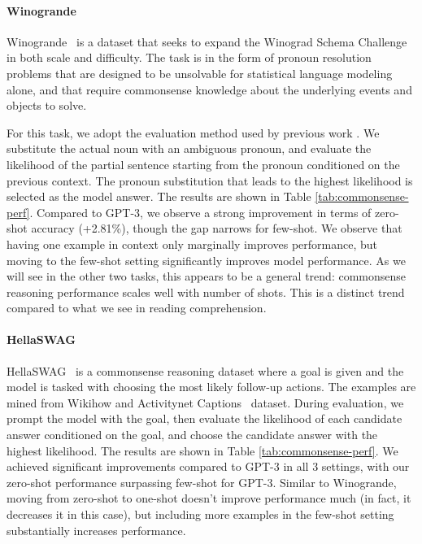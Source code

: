 \documentclass[11pt]{article}
\begin{document}
\paragraph{Winogrande} Winogrande~\citep{Sakaguchi2020WINOGRANDEAA} is a dataset that seeks to expand the Winograd Schema Challenge in both scale and difficulty. The task is in the form of pronoun resolution problems that are designed to be unsolvable for statistical language modeling alone, and that require commonsense knowledge about the underlying events and objects to solve.

For this task, we adopt the evaluation method used by previous work \cite{brown2020language,gpt2-radford2019language,trinh18}. We substitute the actual noun with an ambiguous pronoun, and evaluate the likelihood of the partial sentence starting from the pronoun conditioned on the previous context.  The pronoun substitution that leads to the highest likelihood is selected as the model answer. The results are shown in Table \ref{tab:commonsense-perf}. Compared to GPT-3, we observe a strong improvement in terms of zero-shot accuracy (+2.81\%), though the gap narrows for few-shot. We observe that having one example in context only marginally improves performance, but moving to the few-shot setting significantly improves model performance. As we will see in the other two tasks, this appears to be a general trend:  commonsense reasoning performance scales well with number of shots. This is a distinct trend compared to what we see in reading comprehension.

\paragraph{HellaSWAG} HellaSWAG~\citep{Zellers2019HellaSwagCA} is a commonsense reasoning dataset where a goal is given and the model is tasked with choosing the most likely follow-up actions. The examples are mined from Wikihow and Activitynet Captions~\citep{Krishna2017DenseCaptioningEI} dataset. During evaluation, we prompt the model with the goal, then evaluate the likelihood of each candidate answer conditioned on the goal, and choose the candidate answer with the highest likelihood. The results are shown in Table \ref{tab:commonsense-perf}. We achieved significant improvements compared to GPT-3 in all 3 settings, with our zero-shot performance surpassing few-shot for GPT-3. Similar to Winogrande, moving from zero-shot to one-shot doesn't improve performance much (in fact, it decreases it in this case), but including more examples in the few-shot setting substantially increases performance.
\end{document}
